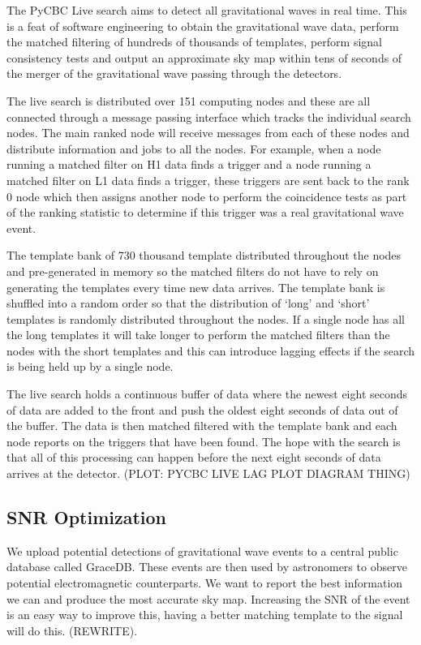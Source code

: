 The PyCBC Live search aims to detect all gravitational waves in real time. This is a feat of software engineering to obtain the gravitational wave data, perform the matched filtering of hundreds of thousands of templates, perform signal consistency tests and output an approximate sky map within tens of seconds of the merger of the gravitational wave passing through the detectors.

The live search is distributed over 151 computing nodes and these are all connected through a message passing interface which tracks the individual search nodes. The main ranked node will receive messages from each of these nodes and distribute information and jobs to all the nodes. For example, when a node running a matched filter on H1 data finds a trigger and a node running a matched filter on L1 data finds a trigger, these triggers are sent back to the rank 0 node which then assigns another node to perform the coincidence tests as part of the ranking statistic to determine if this trigger was a real gravitational wave event.

The template bank of 730 thousand template distributed throughout the nodes and pre-generated in memory so the matched filters do not have to rely on generating the templates every time new data arrives. The template bank is shuffled into a random order so that the distribution of `long' and `short' templates is randomly distributed throughout the nodes. If a single node has all the long templates it will take longer to perform the matched filters than the nodes with the short templates and this can introduce lagging effects if the search is being held up by a single node.

The live search holds a continuous buffer of data where the newest eight seconds of data are added to the front and push the oldest eight seconds of data out of the buffer. The data is then matched filtered with the template bank and each node reports on the triggers that have been found. The hope with the search is that all of this processing can happen before the next eight seconds of data arrives at the detector. (PLOT: PYCBC LIVE LAG PLOT DIAGRAM THING)

\subsection{\label{2:sec:snr-optimization}SNR Optimization}

We upload potential detections of gravitational wave events to a central public database called GraceDB. These events are then used by astronomers to observe potential electromagnetic counterparts. We want to report the best information we can and produce the most accurate sky map. Increasing the SNR of the event is an easy way to improve this, having a better matching template to the signal will do this. (REWRITE).


